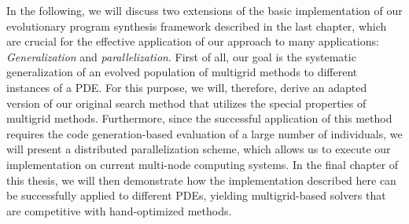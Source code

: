 In the following, we will discuss two extensions of the basic implementation of our evolutionary program synthesis framework described in the last chapter, which are crucial for the effective application of our approach to many applications: \emph{Generalization} and \emph{parallelization}.  
First of all, our goal is the systematic generalization of an evolved population of multigrid methods to different instances of a PDE.
For this purpose, we will, therefore, derive an adapted version of our original search method that utilizes the special properties of multigrid methods.
Furthermore, since the successful application of this method requires the code generation-based evaluation of a large number of individuals, we will present a distributed parallelization scheme, which allows us to execute our implementation on current multi-node computing systems.
In the final chapter of this thesis, we will then demonstrate how the implementation described here can be successfully applied to different PDEs, yielding multigrid-based solvers that are competitive with hand-optimized methods. 

